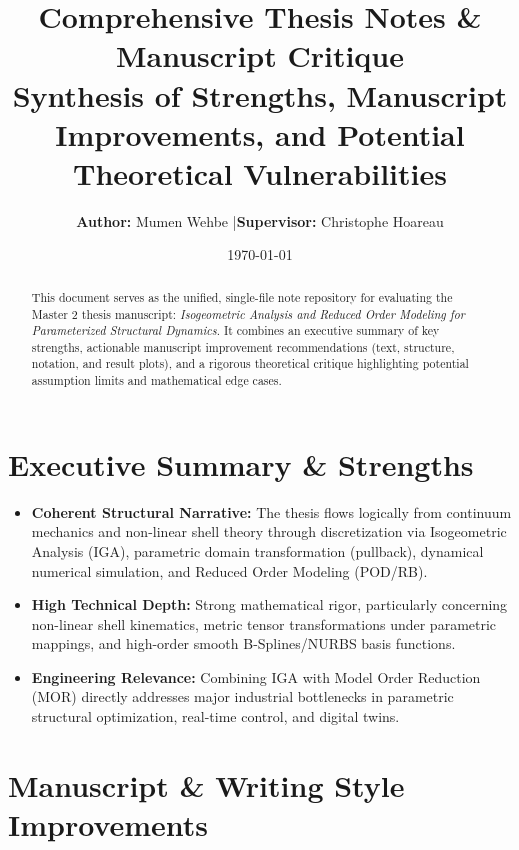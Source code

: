\documentclass[12pt,a4paper]{article}
\title{\textbf{Comprehensive Thesis Notes \& Manuscript Critique}\\[0.5em]
\large Synthesis of Strengths, Manuscript Improvements, and Potential Theoretical Vulnerabilities}
\author{\textbf{Author:} Mumen Wehbe \quad|\quad \textbf{Supervisor:} Christophe Hoareau}
\date{\today}
\begin{document}
\maketitle

\begin{abstract}
This document serves as the unified, single-file note repository for evaluating the Master 2 thesis manuscript: \textit{Isogeometric Analysis and Reduced Order Modeling for Parameterized Structural Dynamics}. It combines an executive summary of key strengths, actionable manuscript improvement recommendations (text, structure, notation, and result plots), and a rigorous theoretical critique highlighting potential assumption limits and mathematical edge cases.
\end{abstract}

\tableofcontents
\newpage

\section{Executive Summary \& Strengths}

\begin{itemize}[leftmargin=*]
    \item \textbf{Coherent Structural Narrative:} The thesis flows logically from continuum mechanics and non-linear shell theory through discretization via Isogeometric Analysis (IGA), parametric domain transformation (pullback), dynamical numerical simulation, and Reduced Order Modeling (POD/RB).
    \item \textbf{High Technical Depth:} Strong mathematical rigor, particularly concerning non-linear shell kinematics, metric tensor transformations under parametric mappings, and high-order smooth B-Splines/NURBS basis functions.
    \item \textbf{Engineering Relevance:} Combining IGA with Model Order Reduction (MOR) directly addresses major industrial bottlenecks in parametric structural optimization, real-time control, and digital twins.
\end{itemize}

\section{Manuscript \& Writing Style Improvements}
\end{document}
